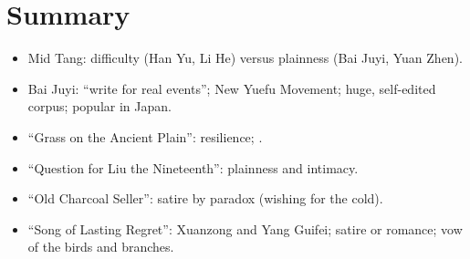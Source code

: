 \section*{Summary}
\begin{itemize}
  \item Mid Tang: difficulty (Han Yu, Li He) versus plainness (Bai Juyi, Yuan Zhen).
  \item Bai Juyi: ``write for real events''; New Yuefu Movement; huge, self-edited
        corpus; popular in Japan.
  \item ``Grass on the Ancient Plain'': resilience; .
  \item ``Question for Liu the Nineteenth'': plainness and intimacy.
  \item ``Old Charcoal Seller'': satire by paradox (wishing for the cold).
  \item ``Song of Lasting Regret'': Xuanzong and Yang Guifei; satire or romance; vow of the
        birds and branches.
\end{itemize}
